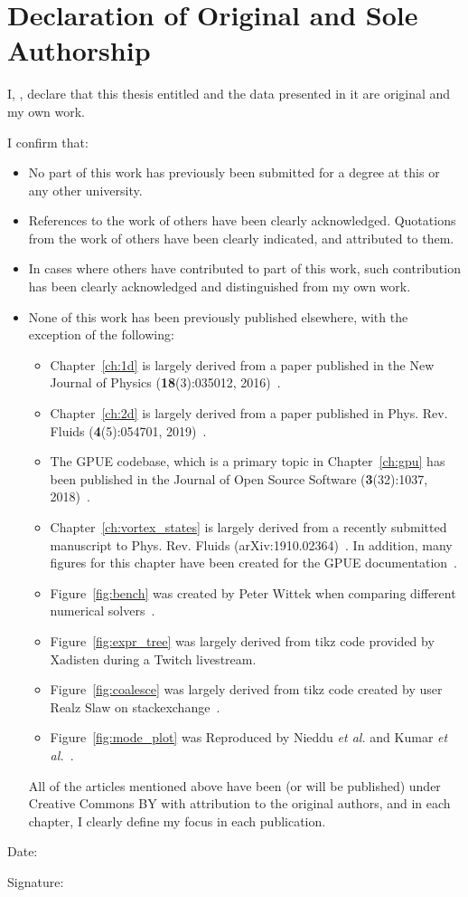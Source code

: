 \chapter*{Declaration of Original and Sole Authorship} 

I, \name, declare that this thesis entitled \emph{\thesistitle} and the data presented in it are original and my own work. 


I confirm that:
\begin{itemize}
\item No part of this work has previously been submitted for a degree at this or any other university.
\item References to the work of others have been clearly acknowledged. Quotations from the work of others have been clearly indicated, and attributed to them.
\item In cases where others have contributed to part of this work, such contribution has been clearly acknowledged and distinguished from my own work.
\item None of this work has been previously published elsewhere, with the exception of the following: 
\begin{itemize}
\item Chapter~\ref{ch:1d} is largely derived from a paper published in the New Journal of Physics (\textbf{18}(3):035012, 2016)~\cite{schloss2016}.
\item Chapter~\ref{ch:2d} is largely derived from a paper published in Phys. Rev. Fluids (\textbf{4}(5):054701, 2019)~\cite{zhang2019}.
\item The GPUE codebase, which is a primary topic in Chapter~\ref{ch:gpu} has been published in the Journal of Open Source Software (\textbf{3}(32):1037, 2018)~\cite{schloss2018}.
\item Chapter~\ref{ch:vortex_states} is largely derived from a recently submitted manuscript to Phys. Rev. Fluids (arXiv:1910.02364)~\cite{schloss2019}.
In addition, many figures for this chapter have been created for the GPUE documentation~\cite{docs}.
\item Figure~\ref{fig:bench} was created by Peter Wittek when comparing different numerical solvers~\cite{wittek2016}.
\item Figure~\ref{fig:expr_tree} was largely derived from tikz code provided by Xadisten during a Twitch livestream.
\item Figure~\ref{fig:coalesce} was largely derived from tikz code created by user Realz Slaw on stackexchange~\cite{stackoverflow}.
\item Figure~\ref{fig:mode_plot} was Reproduced by Nieddu \textit{et al.} and Kumar \textit{et al.}~\cite{Nieddu2016, kumar2015}.
\end{itemize}
All of the articles mentioned above have been (or will be published) under Creative Commons BY with attribution to the original authors, and in each chapter, I clearly define my focus in each publication.
\end{itemize}

Date:  \submissiondate

Signature: 




